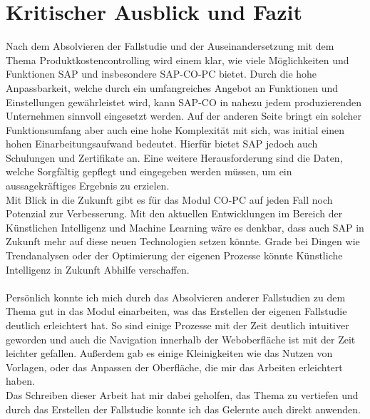 \newpage
\section{Kritischer Ausblick und Fazit}
Nach dem Absolvieren der Fallstudie und der Auseinandersetzung mit dem Thema Produktkostencontrolling wird einem klar, wie viele Möglichkeiten und Funktionen
SAP und insbesondere SAP-CO-PC bietet. Durch die hohe Anpassbarkeit, welche durch ein umfangreiches Angebot an Funktionen und Einstellungen gewährleistet 
wird, kann SAP-CO in nahezu jedem produzierenden Unternehmen sinnvoll eingesetzt werden. Auf der anderen Seite bringt ein solcher Funktionsumfang aber auch eine hohe Komplexität
mit sich, was initial einen hohen Einarbeitungsaufwand bedeutet. Hierfür bietet SAP jedoch auch Schulungen und Zertifikate an. \cite{SchulungSAP} Eine weitere Herausforderung
sind die Daten, welche Sorgfältig gepflegt und eingegeben werden müssen, um ein aussagekräftiges Ergebnis zu erzielen.\\
Mit Blick in die Zukunft gibt es für das Modul CO-PC auf jeden Fall noch Potenzial zur Verbesserung. Mit den aktuellen Entwicklungen im Bereich der Künstlichen Intelligenz und Machine Learning
wäre es denkbar, dass auch SAP in Zukunft mehr auf diese neuen Technologien setzen könnte. Grade bei Dingen wie Trendanalysen oder der Optimierung der eigenen Prozesse könnte Künstliche Intelligenz
in Zukunft Abhilfe verschaffen.
\\
\\
Persönlich konnte ich mich durch das Absolvieren anderer Fallstudien zu dem Thema gut in das Modul einarbeiten, was das Erstellen der eigenen Fallstudie deutlich erleichtert hat. So sind 
einige Prozesse mit der Zeit deutlich intuitiver geworden und auch die Navigation innerhalb der Weboberfläche ist mit der Zeit leichter gefallen. Außerdem gab es einige Kleinigkeiten wie 
das Nutzen von Vorlagen, oder das Anpassen der Oberfläche, die mir das Arbeiten erleichtert haben.\\
Das Schreiben dieser Arbeit hat mir dabei 
geholfen, das Thema zu vertiefen und durch das Erstellen der Fallstudie konnte ich das Gelernte auch direkt anwenden.